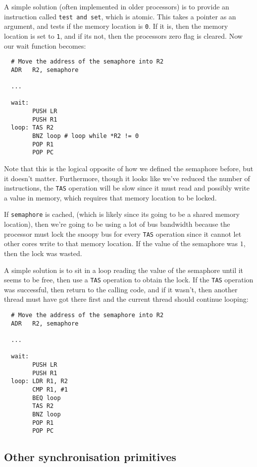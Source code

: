 A simple solution (often implemented in older processors) is to provide an
instruction called \texttt{test and set}, which is atomic. This takes a pointer
as an argument, and tests if the memory location is \texttt{0}. If it is, then
the memory location is set to \texttt{1}, and if its not, then the processors
zero flag is cleared. Now our wait function becomes:

\begin{verbatim}
  # Move the address of the semaphore into R2
  ADR   R2, semaphore

  ...

  wait:
        PUSH LR
        PUSH R1
  loop: TAS R2
        BNZ loop # loop while *R2 != 0
        POP R1
        POP PC
\end{verbatim}

Note that this is the logical opposite of how we defined the semaphore before,
but it doesn't matter. Furthermore, though it looks like we've reduced the
number of instructions, the \texttt{TAS} operation will be slow since it must
read and possibly write a value in memory, which requires that memory location
to be locked.

If \texttt{semaphore} is cached, (which is likely since its going to be a shared
memory location), then we're going to be using a lot of bus bandwidth because
the processor must lock the snoopy bus for every \texttt{TAS} operation since it
cannot let other cores write to that memory location. If the value of the
semaphore was $1$, then the lock was wasted.

A simple solution is to sit in a loop reading the value of the semaphore until
it seems to be free, then use a \texttt{TAS} operation to obtain the lock. If
the \texttt{TAS} operation was successful, then return to the calling code, and
if it wasn't, then another thread must have got there first and the current
thread should continue looping:

\begin{verbatim}
  # Move the address of the semaphore into R2
  ADR   R2, semaphore

  ...

  wait:
        PUSH LR
        PUSH R1
  loop: LDR R1, R2
        CMP R1, #1
        BEQ loop
        TAS R2
        BNZ loop
        POP R1
        POP PC
\end{verbatim}

\subsection{Other synchronisation primitives}

